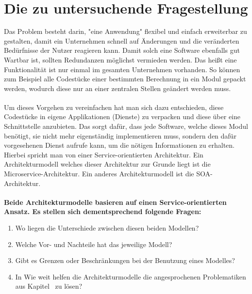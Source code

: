 \section{Die zu untersuchende Fragestellung}
\label{sec:dasProblem}
Das Problem besteht darin, "eine Anwendung" flexibel und einfach erweiterbar zu gestalten, damit ein Unternehmen schnell auf Änderungen und die veränderten Bedürfnisse der Nutzer reagieren kann. Damit solch eine Software ebenfalls gut Wartbar ist, sollten Redundanzen möglichst vermieden werden. Das heißt eine Funktionalität ist nur einmal im gesamten Unternehmen vorhanden. So können zum Beispiel alle Codestücke einer bestimmten Berechnung in ein Modul gepackt werden, wodurch diese  nur an einer zentralen Stellen geändert werden muss.
\\\\
Um dieses Vorgehen zu vereinfachen hat man sich dazu entschieden, diese Codestücke in eigene Applikationen (Dienste) zu verpacken und diese über eine Schnittstelle anzubieten. Das sorgt dafür, dass jede Software, welche dieses Modul benötigt, sie nicht mehr eigenständig implementieren muss, sondern den dafür vorgesehenen Dienst aufrufe kann, um die nötigen Informationen zu erhalten. Hierbei spricht man von einer Service-orientierten Architektur. Ein Architekturmodell welches dieser Architektur zur Grunde liegt ist die Microservice-Architektur. Ein anderes Architekturmodell ist die SOA-Architektur.
\\\\
\textbf{Beide Architekturmodelle basieren auf einen Service-orientierten Ansatz. Es stellen sich dementsprechend folgende Fragen:}
\begin{enumerate}
    \item Wo liegen die Unterschiede zwischen diesen beiden Modellen?
    \item Welche Vor- und Nachteile hat das jeweilige Modell?
    \item Gibt es Grenzen oder Beschränkungen bei der Benutzung eines Modelles?
    \item In Wie weit helfen die Architekturmodelle die angesprochenen Problematiken aus Kapitel \ zu lösen?
\end{enumerate}
     